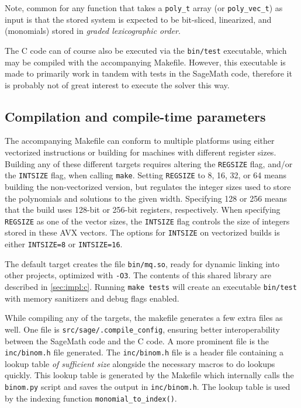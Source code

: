 Note, common for any function that takes a \texttt{poly\_t} array (or \texttt{poly\_vec\_t}) as input is that the stored system is expected to be bit-sliced, linearized, and (monomials) stored in \textit{graded lexicographic order}.

The C code can of course also be executed via the \texttt{bin/test} executable, which may be compiled with the accompanying Makefile. However, this executable is made to primarily work in tandem with tests in the SageMath code, therefore it is probably not of great interest to execute the solver this way.

\subsection{Compilation and compile-time parameters} \label{sec:impl:compile}
The accompanying Makefile can conform to multiple platforms using either vectorized instructions or building for machines with different register sizes. Building any of these different targets requires altering the \texttt{REGSIZE} flag, and/or the \texttt{INTSIZE} flag, when calling \texttt{make}. Setting \texttt{REGSIZE} to 8, 16, 32, or 64 means building the non-vectorized version, but regulates the integer sizes used to store the polynomials and solutions to the given width. Specifying 128 or 256 means that the build uses 128-bit or 256-bit registers, respectively. When specifying \texttt{REGSIZE} as one of the vector sizes, the \texttt{INTSIZE} flag controls the size of integers stored in these AVX vectors. The options for \texttt{INTSIZE} on vectorized builds is either \texttt{INTSIZE=8} or \texttt{INTSIZE=16}.

The default target creates the file \texttt{bin/mq.so}, ready for dynamic linking into other projects, optimized with \texttt{-O3}. The contents of this shared library are described in \cref{sec:impl:c}. Running \texttt{make tests} will create an executable \texttt{bin/test} with memory sanitizers and debug flags enabled. 

While compiling any of the targets, the makefile generates a few extra files as well. One file is \texttt{src/sage/.compile\_config}, ensuring better interoperability between the SageMath code and the C code. A more prominent file is the \texttt{inc/binom.h} file generated. The \texttt{inc/binom.h} file is a header file containing a lookup table \textit{of sufficient size} alongside the necessary macros to do lookups quickly. This lookup table is generated by the Makefile which internally calls the \texttt{binom.py} script and saves the output in \texttt{inc/binom.h}. The lookup table is used by the indexing function \texttt{monomial\_to\_index()}.


\newpage